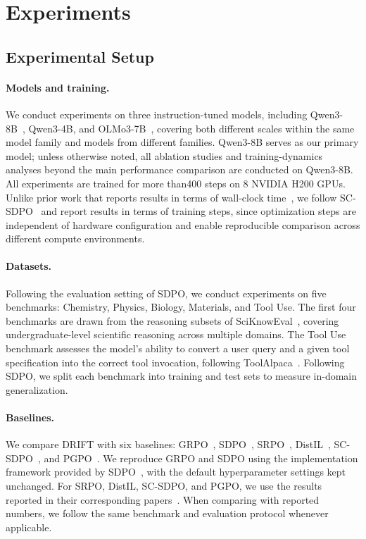 \documentclass{article}
\begin{document}
\section{Experiments}

\subsection{Experimental Setup}

\paragraph{Models and training.}
We conduct experiments on three instruction-tuned models, including Qwen3-8B~\citep{qwen3}, Qwen3-4B, and OLMo3-7B~\citep{olmo2025olmo3}, covering both different scales within the same model family and models from different families. Qwen3-8B serves as our primary model; unless otherwise noted, all ablation studies and training-dynamics analyses beyond the main performance comparison are conducted on Qwen3-8B. All experiments are trained for more than400 steps on 8 NVIDIA H200 GPUs. 
Unlike prior work that reports results in terms of wall-clock time~\citep{hubotter2026reinforcement,li2026srpo}, we follow SC-SDPO~\citep{liu2026scsdpo} and report results in terms of training steps, since optimization steps are independent of hardware configuration and enable reproducible comparison across different compute environments.

\paragraph{Datasets.}
Following the evaluation setting of SDPO, we conduct experiments on five benchmarks: Chemistry, Physics, Biology, Materials, and Tool Use. The first four benchmarks are drawn from the reasoning subsets of SciKnowEval~\citep{feng2024sciknoweval}, covering undergraduate-level scientific reasoning across multiple domains. The Tool Use benchmark assesses the model's ability to convert a user query and a given tool specification into the correct tool invocation, following ToolAlpaca~\citep{tang2023toolalpaca}. Following SDPO, we split each benchmark into training and test sets to measure in-domain generalization.

\paragraph{Baselines.}
We compare DRIFT with six baselines: GRPO~\citep{shao2024deepseekmath}, SDPO~\citep{hubotter2026reinforcement}, SRPO~\citep{li2026srpo}, DistIL~\citep{agrawal2026distil}, SC-SDPO~\citep{liu2026scsdpo}, and PGPO~\citep{wang2026pgpo}. We reproduce GRPO and SDPO using the implementation framework provided by SDPO~\citep{hubotter2026reinforcement}, with the default hyperparameter settings kept unchanged. For SRPO, DistIL, SC-SDPO, and PGPO, we use the results reported in their corresponding papers~\citep{li2026srpo, agrawal2026distil, liu2026scsdpo, wang2026pgpo}. When comparing with reported numbers, we follow the same benchmark and evaluation protocol whenever applicable.
\end{document}
